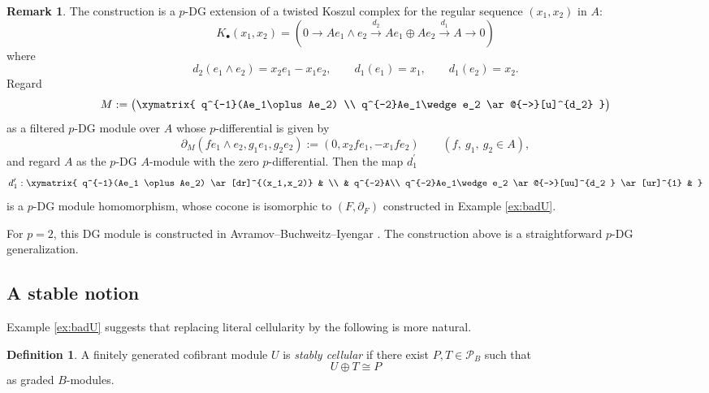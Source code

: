 \documentclass[11pt]{article}
\theoremstyle{definition}
\newtheorem{rem}[thm]{Remark}
\newtheorem{defn}[thm]{Definition}
\numberwithin{equation}{section}
\newcommand{\Pun}{\mathcal{P}_B}
\begin{document}
\begin{rem}\label{rem:koszul-counterexample}
The construction is a $p$-DG extension of a twisted Koszul complex for the regular sequence $(x_1,x_2)$ in $A$:
\begin{equation}
    K_\bullet(x_1,x_2)=
    \left(
    0\to Ae_1\wedge e_2 \xrightarrow{d_2} Ae_1\oplus Ae_2 \xrightarrow{d_1} A\to 0
    \right)
\end{equation}
where
\begin{equation}
    d_2(e_1\wedge e_2)=x_2e_1-x_1e_2,\qquad d_1(e_1)=x_1, \qquad d_1(e_2)=x_2.
\end{equation}
Regard
\[
M:=\left(
\begin{gathered}
    \xymatrix{
 q^{-1}(Ae_1\oplus Ae_2) \\
 q^{-2}Ae_1\wedge e_2 \ar@{-->}[u]^{d_2}
}\end{gathered}
\right)
\]
as a filtered $p$-DG module over $A$ whose $p$-differential is given by
\[
\partial_M (fe_1\wedge e_2,g_1e_1,g_2e_2):=(0, x_2fe_1, -x_1fe_2) \qquad (f, \ g_1, \ g_2\in A),
\]
and regard $A$ as the $p$-DG $A$-module with the zero $p$-differential. Then the map $d_1^\prime$
\begin{equation}
d_1^\prime: 
\begin{gathered}
    \xymatrix{
q^{-1}(Ae_1 \oplus Ae_2)  \ar[dr]^{(x_1,x_2)} &  \\ 
 &  q^{-2}A\\
 q^{-2}Ae_1\wedge e_2 \ar@{-->}[uu]^{d_2 } \ar[ur]^{1} &
}
\end{gathered}
\end{equation}
is a $p$-DG module homomorphism, whose cocone is isomorphic to $(F,\partial_F)$ constructed in Example \ref{ex:badU}.

For $p=2$, this DG module is constructed in Avramov--Buchweitz--Iyengar \cite[Example 5.6]{ABI}.  The construction above is a straightforward $p$-DG generalization.
\end{rem}



\subsection{A stable notion} 
Example \ref{ex:badU} suggests that replacing literal cellularity by the following is more natural.

\begin{defn}\label{def:stably-cellular}
A finitely generated cofibrant module $U$ is \emph{stably cellular} if there exist $P,T\in\Pun$ such that
\begin{equation}\label{eq:stably-cellular}
U\oplus T\cong P
\end{equation}
as graded $B$-modules.
\end{defn}
\end{document}
